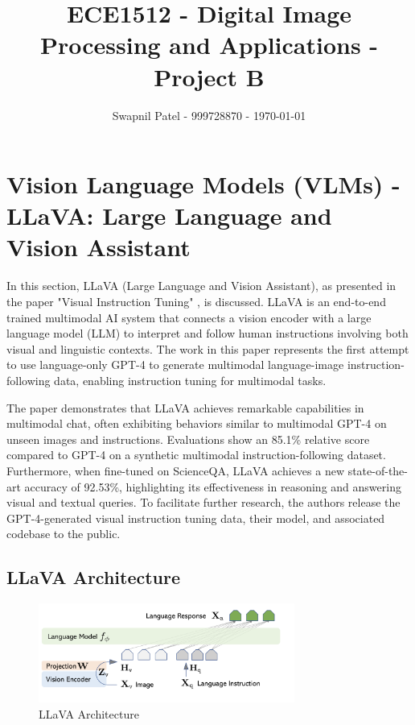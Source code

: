 \documentclass[12pt, conference, compsoc, onecolumn]{IEEEtran}
\begin{document}
	\title{ECE1512 - Digital Image Processing and Applications - Project B}
	\author{Swapnil Patel - 999728870 - \today}
	
	\author{
		}
	
	\maketitle
	
	\section{Vision Language Models (VLMs) - LLaVA: Large Language and Vision Assistant}
	
	In this section, LLaVA (Large Language and Vision Assistant), as presented in the paper "Visual Instruction Tuning" \cite{liu2023llava}, is discussed. LLaVA is an end-to-end trained multimodal AI system that connects a vision encoder with a large language model (LLM) to interpret and follow human instructions involving both visual and linguistic contexts. The work in this paper represents the first attempt to use language-only GPT-4 to generate multimodal language-image instruction-following data, enabling instruction tuning for multimodal tasks.
	
	The paper demonstrates that LLaVA achieves remarkable capabilities in multimodal chat, often exhibiting behaviors similar to multimodal GPT-4 on unseen images and instructions. Evaluations show an 85.1\% relative score compared to GPT-4 on a synthetic multimodal instruction-following dataset. Furthermore, when fine-tuned on ScienceQA, LLaVA achieves a new state-of-the-art accuracy of 92.53\%, highlighting its effectiveness in reasoning and answering visual and textual queries. To facilitate further research, the authors release the GPT-4-generated visual instruction tuning data, their model, and associated codebase to the public.
	
	\subsection{LLaVA Architecture}
	\begin{figure}[H]
		\centering
		\includegraphics[width=0.75\textwidth]{figures/conceptual-diagram-of-llava.png}
		\caption{LLaVA Architecture \cite{liu2023llava}}
		\label{fig:llava_arch}
	\end{figure}
	
\end{document}
